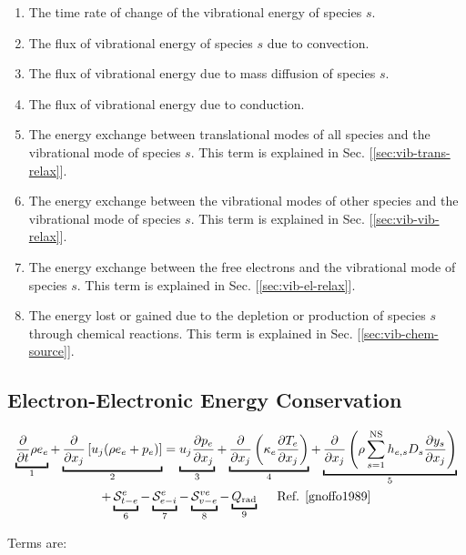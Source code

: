 \documentclass[10pt]{article}
\begin{document}
\begin{flushleft}
\begin{enumerate}
    \item The time rate of change of the vibrational energy of species $s$.
    \item The flux of vibrational energy of species $s$ due to convection.
    \item The flux of vibrational energy due to mass diffusion of species $s$.
    \item The flux of vibrational energy due to conduction.
    \item The energy exchange between translational modes of all species and the vibrational mode of species $s$. This term is explained in Sec. [\ref{sec:vib-trans-relax}].
    \item The energy exchange between the vibrational modes of other species and the vibrational mode of species $s$. This term is explained in Sec. [\ref{sec:vib-vib-relax}].
    \item The energy exchange between the free electrons and the vibrational mode of species $s$. This term is explained in Sec. [\ref{sec:vib-el-relax}].
    \item The energy lost or gained due to the depletion or production of species $s$ through chemical reactions. This term is explained in Sec. [\ref{sec:vib-chem-source}].
\end{enumerate}


\subsection{Electron-Electronic Energy Conservation}

\begin{multline}
    \ub{\pd{}{t} \rho e_e}{1} + \ub{\pd{}{x_j} \bb{u_j(\rho e_e + p_e)}}{2} = \ub{u_j \pd{p_e}{x_j} }{3} + \ub{\pd{}{x_j} \bp{\kappa_e \pd{T_e}{x_j}}}{4} + \ub{\pd{}{x_j} \bp{\rho \sum_{s=1}^\text{NS} h_{e,s} D_s \pd{y_s}{x_j}}}{5} \\ + \ub{\mathcal{S}_{t-e}^e}{6}  - \ub{\mathcal{S}_{e-i}^{e}}{7} - \ub{\mathcal{S}_{v-e}^{ve}}{8} - \ub{Q_\text{rad}}{9} \hspace{5mm} \text{Ref. \cite{gnoffo1989}}
\end{multline}

Terms are:


\end{flushleft}
\end{document}
